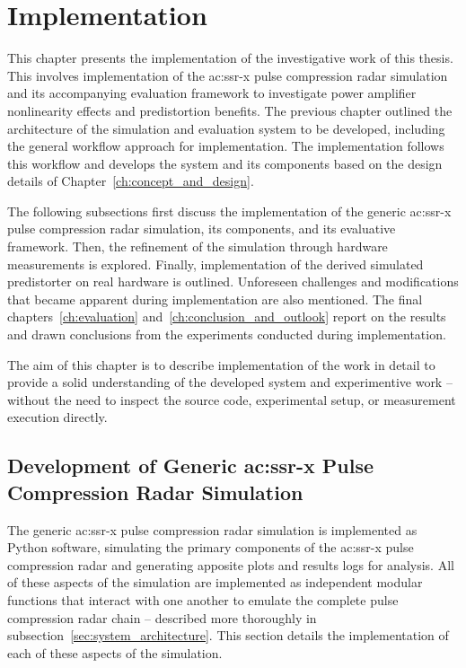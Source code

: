 %
\chapter{Implementation}\label{ch:implementation}

This chapter presents the implementation of the investigative work of this thesis. This involves implementation of the \gls{ac:ssr-x} pulse compression radar simulation and its accompanying evaluation framework to investigate power amplifier nonlinearity effects and predistortion benefits. The previous chapter outlined the architecture of the simulation and evaluation system to be developed, including the general workflow approach for implementation. The implementation follows this workflow and develops the system and its components based on the design details of Chapter~\ref{ch:concept_and_design}. 

The following subsections first discuss the implementation of the generic \gls{ac:ssr-x} pulse compression radar simulation, its components, and its evaluative framework. Then, the refinement of the simulation through hardware measurements is explored. Finally, implementation of the derived simulated predistorter on real hardware is outlined. Unforeseen challenges and modifications that became apparent during implementation are also mentioned. The final chapters~\ref{ch:evaluation} and~\ref{ch:conclusion_and_outlook} report on the results and drawn conclusions from the experiments conducted during implementation.

The aim of this chapter is to describe implementation of the work in detail to provide a solid understanding of the developed system and experimentive work -- without the need to inspect the source code, experimental setup, or measurement execution directly.  

\section{Development of Generic \gls{ac:ssr-x} Pulse Compression Radar Simulation}

The generic \gls{ac:ssr-x} pulse compression radar simulation is implemented as Python software, simulating the primary components of the \gls{ac:ssr-x} pulse compression radar and generating apposite plots and results logs for analysis. All of these aspects of the simulation are implemented as independent modular functions that interact with one another to emulate the complete pulse compression radar chain -- described more thoroughly in subsection~\ref{sec:system_architecture}. This section details the implementation of each of these aspects of the simulation. 

